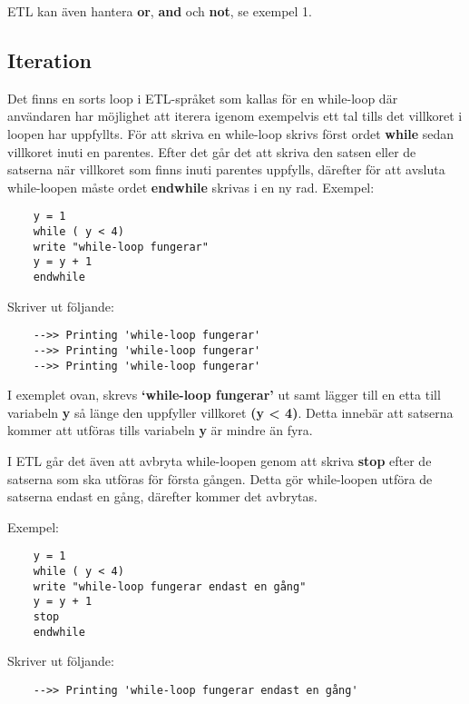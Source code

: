 \documentclass{TDP019mall}
\begin{document}
ETL kan även hantera \textbf{or}, \textbf{and} och \textbf{not}, se exempel 1.

\newpage
\subsection{Iteration}
Det finns en sorts loop i ETL-språket som kallas för en while-loop där användaren har möjlighet att iterera igenom exempelvis ett tal tills det villkoret i loopen har uppfyllts. 
För att skriva en while-loop skrivs först ordet \textbf{while} sedan villkoret inuti en parentes. Efter det går det att skriva den satsen eller de satserna när villkoret som finns inuti parentes uppfylls, därefter för att avsluta while-loopen måste ordet \textbf{endwhile} skrivas i en ny rad. 
Exempel: 
\begin{verbatim}
    y = 1
    while ( y < 4)
    write "while-loop fungerar"
    y = y + 1
    endwhile
\end{verbatim}
 
Skriver ut följande:
\begin{verbatim}
    -->> Printing 'while-loop fungerar'
    -->> Printing 'while-loop fungerar'
    -->> Printing 'while-loop fungerar'
\end{verbatim}
 
I exemplet ovan, skrevs \textbf{‘while-loop fungerar’} ut samt lägger till en etta till variabeln \textbf{y} så länge den 
uppfyller villkoret \textbf{(y < 4)}. Detta innebär att satserna kommer att utföras tills variabeln \textbf{y} är mindre än fyra. 
 
I ETL går det även att avbryta while-loopen genom att skriva \textbf{stop} efter de satserna som ska utföras för första gången. 
Detta gör while-loopen utföra de satserna endast en gång, därefter kommer det avbrytas.

Exempel: 
\begin{verbatim}
    y = 1
    while ( y < 4)
    write "while-loop fungerar endast en gång"
    y = y + 1
    stop
    endwhile
\end{verbatim}
 
Skriver ut följande:
\begin{verbatim}
    -->> Printing 'while-loop fungerar endast en gång'
\end{verbatim}
\end{document}
